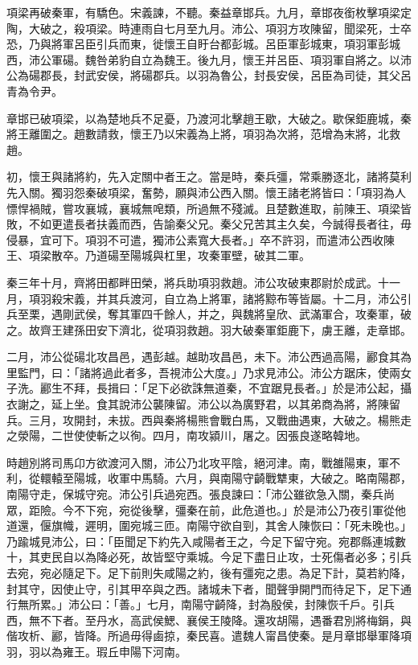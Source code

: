 \begin{pinyinscope}
項梁再破秦軍，有驕色。宋義諫，不聽。秦益章邯兵。九月，章邯夜銜枚擊項梁定陶，大破之，殺項梁。時連雨自七月至九月。沛公、項羽方攻陳留，聞梁死，士卒恐，乃與將軍呂臣引兵而東，徙懷王自盱台都彭城。呂臣軍彭城東，項羽軍彭城西，沛公軍碭。魏咎弟豹自立為魏王。後九月，懷王并呂臣、項羽軍自將之。以沛公為碭郡長，封武安侯，將碭郡兵。以羽為魯公，封長安侯，呂臣為司徒，其父呂青為令尹。

章邯已破項梁，以為楚地兵不足憂，乃渡河北擊趙王歇，大破之。歇保鉅鹿城，秦將王離圍之。趙數請救，懷王乃以宋義為上將，項羽為次將，范增為末將，北救趙。

初，懷王與諸將約，先入定關中者王之。當是時，秦兵彊，常乘勝逐北，諸將莫利先入關。獨羽怨秦破項梁，奮勢，願與沛公西入關。懷王諸老將皆曰：「項羽為人慓悍禍賊，嘗攻襄城，襄城無唣類，所過無不殘滅。且楚數進取，前陳王、項梁皆敗，不如更遣長者扶義而西，告諭秦父兄。秦父兄苦其主久矣，今誠得長者往，毋侵暴，宜可下。項羽不可遣，獨沛公素寬大長者。」卒不許羽，而遣沛公西收陳王、項梁散卒。乃道碭至陽城與杠里，攻秦軍壁，破其二軍。

秦三年十月，齊將田都畔田榮，將兵助項羽救趙。沛公攻破東郡尉於成武。十一月，項羽殺宋義，并其兵渡河，自立為上將軍，諸將黥布等皆屬。十二月，沛公引兵至栗，遇剛武侯，奪其軍四千餘人，并之，與魏將皇欣、武滿軍合，攻秦軍，破之。故齊王建孫田安下濟北，從項羽救趙。羽大破秦軍鉅鹿下，虜王離，走章邯。

二月，沛公從碭北攻昌邑，遇彭越。越助攻昌邑，未下。沛公西過高陽，酈食其為里監門，曰：「諸將過此者多，吾視沛公大度。」乃求見沛公。沛公方踞床，使兩女子洗。酈生不拜，長揖曰：「足下必欲誅無道秦，不宜踞見長者。」於是沛公起，攝衣謝之，延上坐。食其說沛公襲陳留。沛公以為廣野君，以其弟商為將，將陳留兵。三月，攻開封，未拔。西與秦將楊熊會戰白馬，又戰曲遇東，大破之。楊熊走之滎陽，二世使使斬之以徇。四月，南攻潁川，屠之。因張良遂略韓地。

時趙別將司馬卬方欲渡河入關，沛公乃北攻平陰，絕河津。南，戰雒陽東，軍不利，從轘轅至陽城，收軍中馬騎。六月，與南陽守齮戰犨東，大破之。略南陽郡，南陽守走，保城守宛。沛公引兵過宛西。張良諫曰：「沛公雖欲急入關，秦兵尚眾，距險。今不下宛，宛從後擊，彊秦在前，此危道也。」於是沛公乃夜引軍從他道還，偃旗幟，遲明，圍宛城三匝。南陽守欲自剄，其舍人陳恢曰：「死未晚也。」乃踰城見沛公，曰：「臣聞足下約先入咸陽者王之，今足下留守宛。宛郡縣連城數十，其吏民自以為降必死，故皆堅守乘城。今足下盡日止攻，士死傷者必多；引兵去宛，宛必隨足下。足下前則失咸陽之約，後有彊宛之患。為足下計，莫若約降，封其守，因使止守，引其甲卒與之西。諸城未下者，聞聲爭開門而待足下，足下通行無所累。」沛公曰：「善。」七月，南陽守齮降，封為殷侯，封陳恢千戶。引兵西，無不下者。至丹水，高武侯鰓、襄侯王陵降。還攻胡陽，遇番君別將梅鋗，與偕攻析、酈，皆降。所過毋得鹵掠，秦民喜。遣魏人甯昌使秦。是月章邯舉軍降項羽，羽以為雍王。瑕丘申陽下河南。


\end{pinyinscope}
